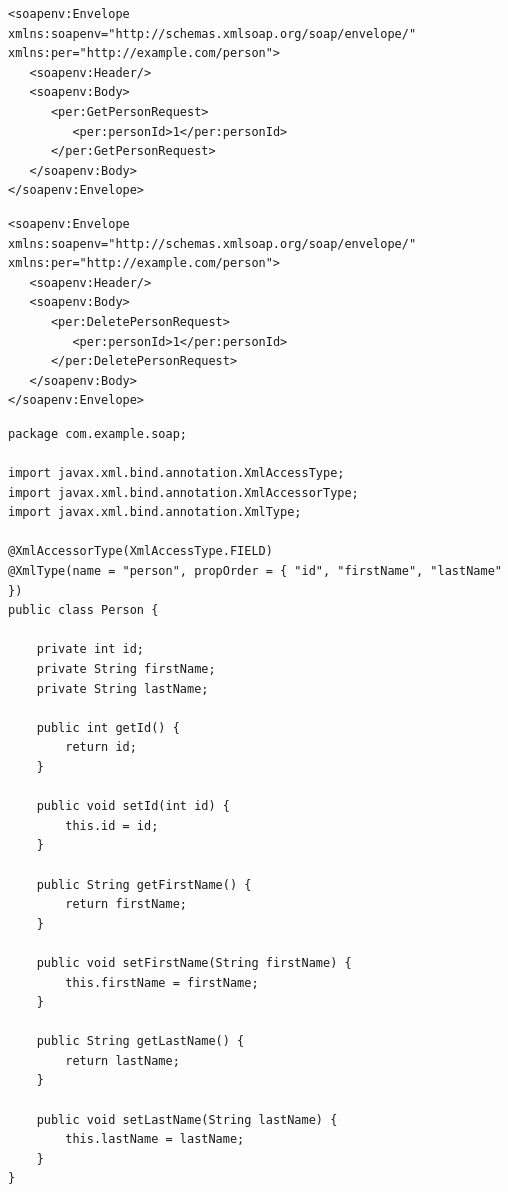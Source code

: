 \documentclass[../vs-script-first-v01.tex]{subfiles}
\begin{document}
\noindent\begin{minipage}{\textwidth}
\begin{lstlisting}[caption={SOAP read},captionpos=b,label={lst:s_read}]
<soapenv:Envelope xmlns:soapenv="http://schemas.xmlsoap.org/soap/envelope/" xmlns:per="http://example.com/person">
   <soapenv:Header/>
   <soapenv:Body>
      <per:GetPersonRequest>
         <per:personId>1</per:personId>
      </per:GetPersonRequest>
   </soapenv:Body>
</soapenv:Envelope>
\end{lstlisting}
\end{minipage}
\noindent\begin{minipage}{\textwidth}
\begin{lstlisting}[caption={SOAP delete},captionpos=b,label={lst:s_delete}]
<soapenv:Envelope xmlns:soapenv="http://schemas.xmlsoap.org/soap/envelope/" xmlns:per="http://example.com/person">
   <soapenv:Header/>
   <soapenv:Body>
      <per:DeletePersonRequest>
         <per:personId>1</per:personId>
      </per:DeletePersonRequest>
   </soapenv:Body>
</soapenv:Envelope>
\end{lstlisting}
\end{minipage}
\noindent\begin{minipage}{\textwidth}
\begin{lstlisting}[caption={SOAP Class Person},captionpos=b,label={lst:soap_person}]
package com.example.soap;

import javax.xml.bind.annotation.XmlAccessType;
import javax.xml.bind.annotation.XmlAccessorType;
import javax.xml.bind.annotation.XmlType;

@XmlAccessorType(XmlAccessType.FIELD)
@XmlType(name = "person", propOrder = { "id", "firstName", "lastName" })
public class Person {

    private int id;
    private String firstName;
    private String lastName;

    public int getId() {
        return id;
    }

    public void setId(int id) {
        this.id = id;
    }

    public String getFirstName() {
        return firstName;
    }

    public void setFirstName(String firstName) {
        this.firstName = firstName;
    }

    public String getLastName() {
        return lastName;
    }

    public void setLastName(String lastName) {
        this.lastName = lastName;
    }
}
\end{lstlisting}
\end{minipage}
\end{document}
